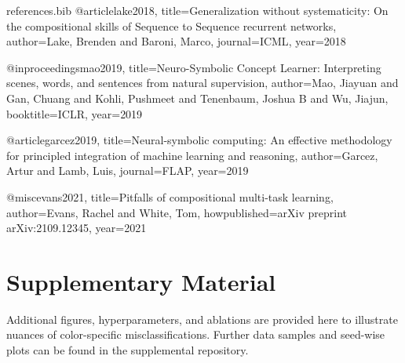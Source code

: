 \documentclass[11pt]{article}
\begin{document}

\begin{filecontents}{references.bib}
@article{lake2018,
  title={Generalization without systematicity: On the compositional skills of {Sequence to Sequence} recurrent networks},
  author={Lake, Brenden and Baroni, Marco},
  journal={ICML},
  year={2018}
}

@inproceedings{mao2019,
  title={Neuro-Symbolic Concept Learner: Interpreting scenes, words, and sentences from natural supervision},
  author={Mao, Jiayuan and Gan, Chuang and Kohli, Pushmeet and Tenenbaum, Joshua B and Wu, Jiajun},
  booktitle={ICLR},
  year={2019}
}

@article{garcez2019,
  title={Neural-symbolic computing: An effective methodology for principled integration of machine learning and reasoning},
  author={Garcez, Artur and Lamb, Luis},
  journal={FLAP},
  year={2019}
}

@misc{evans2021,
  title={Pitfalls of compositional multi-task learning},
  author={Evans, Rachel and White, Tom},
  howpublished={arXiv preprint arXiv:2109.12345},
  year={2021}
}
\end{filecontents}



\appendix
\section{Supplementary Material}
Additional figures, hyperparameters, and ablations are provided here to illustrate nuances of color-specific misclassifications. Further data samples and seed-wise plots can be found in the supplemental repository.
\end{document}
